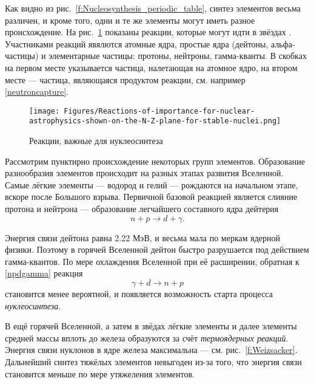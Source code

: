 \documentclass[a5paper,openany]{book}
\begin{document}
Как видно из  рис.~\ref{f:Nucleosynthesis_periodic_table},  синтез элементов весьма различен, и кроме того, одни и те же элементы могут иметь разное происхождение.
На рис.~\ref{f:Reactions-of-importance-for-nuclear-astrophysics} показаны реакции, которые могут идти в звёздах  \cite{Smith2023}. Участниками реакций явялются атомные ядра, простые ядра (дейтоны, альфа-частицы) и элементарные частицы: протоны, нейтроны, гамма-кванты. В скобках на первом месте указывается частица, налетающая на атомное ядро, на втором месте --- частица, являющаяся продуктом реакции, см. например \eqref{neutroncapture}.
	\begin{figure}[ht] 
	\centering\small
	\texttt{[image: Figures/Reactions-of-importance-for-nuclear-astrophysics-shown-on-the-N-Z-plane-for-stable-nuclei.png]}
	\caption{Реакции, важные для нуклеосинтеза \cite{Smith2023}} 
	\label{f:Reactions-of-importance-for-nuclear-astrophysics}
\end{figure}


	Рассмотрим пунктирно происхождение некоторых групп элементов.
	Образование разнообразия элементов происходит на разных этапах развития Вселенной. Самые лёгкие элементы --- водород и гелий --- рождаются на начальном этапе, вскоре после Большого взрыва. Первичной базовой реакцией является слияние протона и нейтрона --- образование легчайшего составного ядра  дейтерия 
	\begin{equation}\label{npdgamma}
	n + p \longrightarrow d + \gamma.
	\end{equation}

	Энергия связи дейтона равна 2.22 МэВ, и весьма мала по меркам ядерной физики. Поэтому в горячей Вселенной дейтон быстро разрушается под действием гамма-квантов. По мере охлаждения Вселенной при её расширении, обратная к \eqref{npdgamma} реакция  
	\begin{equation}\label{gammad}
	\gamma +	d  \longrightarrow n + p 
	\end{equation}
	становится менее вероятной, и появляется возможность старта процесса \emph{нуклеосинтеза}. 
	
	В ещё горячей Вселенной, а затем в звёдах лёгкие элементы и далее элементы средней массы вплоть до железа образуются за счёт  \emph{термоядерных реакций}. Энергия связи нуклонов в ядре железа максимальна --- см. рис.~\ref{f:Weizsacker}. Дальнейший синтез тяжёлых элементов невыгоден из-за того, что энергия связи становится меньше по мере утяжеления элементов.
	
\end{document}
